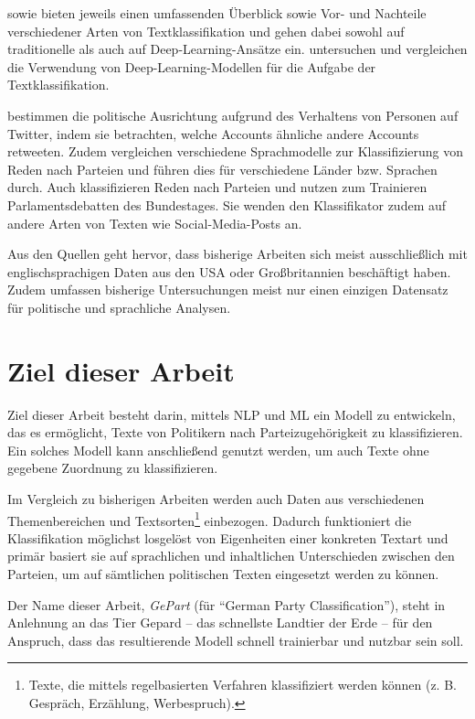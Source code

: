 \textcite{li_survey_2021} sowie \textcite{kowsari_text_2019} bieten jeweils einen umfassenden Überblick sowie Vor- und Nachteile verschiedener Arten von Textklassifikation und gehen dabei sowohl auf traditionelle als auch auf Deep-Learning-Ansätze ein.
\textcite{minaee_deep_2022} untersuchen und vergleichen die Verwendung von Deep-Learning-Modellen für die Aufgabe der Textklassifikation.

\textcite{wong_quantifying_2016} bestimmen die politische Ausrichtung aufgrund des Verhaltens von Personen auf Twitter, indem sie betrachten, welche Accounts ähnliche andere Accounts retweeten.
Zudem vergleichen \textcite{doan_using_2022} verschiedene Sprachmodelle zur Klassifizierung von Reden nach Parteien und führen dies für verschiedene Länder bzw. Sprachen durch.
Auch \textcite{biessmann_predicting_2016} klassifizieren Reden nach Parteien und nutzen zum Trainieren Parlamentsdebatten des Bundestages. Sie wenden den Klassifikator zudem auf andere Arten von Texten wie Social-Media-Posts an.

Aus den Quellen geht hervor, dass bisherige Arbeiten sich meist ausschließlich mit englischsprachigen Daten aus den USA oder Großbritannien beschäftigt haben. Zudem umfassen bisherige Untersuchungen meist nur einen einzigen Datensatz für politische und sprachliche Analysen.

\section{Ziel dieser Arbeit} \label{sec:thesisGoal}

Ziel dieser Arbeit besteht darin, mittels \ac{NLP} und \ac{ML} ein Modell zu entwickeln, das es ermöglicht, Texte von Politikern nach Parteizugehörigkeit zu klassifizieren. Ein solches Modell kann anschließend genutzt werden, um auch Texte ohne gegebene Zuordnung zu klassifizieren.

Im Vergleich zu bisherigen Arbeiten werden auch Daten aus verschiedenen Themenbereichen und Textsorten\footnote{Texte, die mittels regelbasierten Verfahren klassifiziert werden können (z. B. Gespräch, Erzählung, Werbespruch).} einbezogen. Dadurch funktioniert die Klassifikation möglichst losgelöst von Eigenheiten einer konkreten Textart und primär basiert sie auf sprachlichen und inhaltlichen Unterschieden zwischen den Parteien, um auf sämtlichen politischen Texten eingesetzt werden zu können.

Der Name dieser Arbeit, \textit{GePart} (für \enquote{German Party Classification}), steht in Anlehnung an das Tier Gepard -- das schnellste Landtier der Erde -- für den Anspruch, dass das resultierende Modell schnell trainierbar und nutzbar sein soll.

